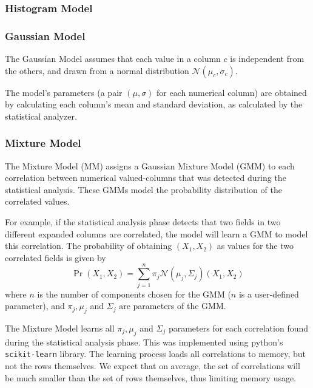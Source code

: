 
\subsubsection{Histogram Model}
\subsubsection{Gaussian Model}
\label{sec:gaus_model}
The Gaussian Model assumes that each value in a column $c$ is  independent from the others, and drawn from a normal distribution $\mathcal N(\mu_c, \sigma_c)$.

The model's parameters (a pair $(\mu, \sigma)$ for each numerical column) are obtained by calculating each column's mean and standard deviation, as calculated by the statistical analyzer. %

\subsubsection{Mixture Model}

The Mixture Model (MM) assigns a Gaussian Mixture Model (GMM) to each correlation between numerical valued-columns that was detected during the statistical analysis. These GMMs model the probability distribution of the correlated values.

For example, if the statistical analysis phase detects that two fields in two different expanded columns are correlated, the model will learn a GMM to model this correlation. The probability of obtaining $(X_1, X_2)$ as values for the two correlated fields is given by
\[\Pr(X_1, X_2) = \sum_{j=1}^{n} \pi_j \mathcal N(\mu_j, \Sigma_j)(X_1, X_2)\]
where $n$ is the number of components chosen for the GMM ($n$ is a user-defined parameter), and $\pi_j, \mu_j$ and $\Sigma_j$ are parameters of the GMM. 

The Mixture Model learns all  $\pi_j, \mu_j$ and $\Sigma_j$ parameters for each correlation found during the statistical analysis phase. This was implemented using python's \texttt{scikit-learn} library. The learning process loads all correlations to memory, but not the rows themselves. We expect that on average, the set of correlations will be much smaller than the set of rows themselves, thus limiting memory usage.

